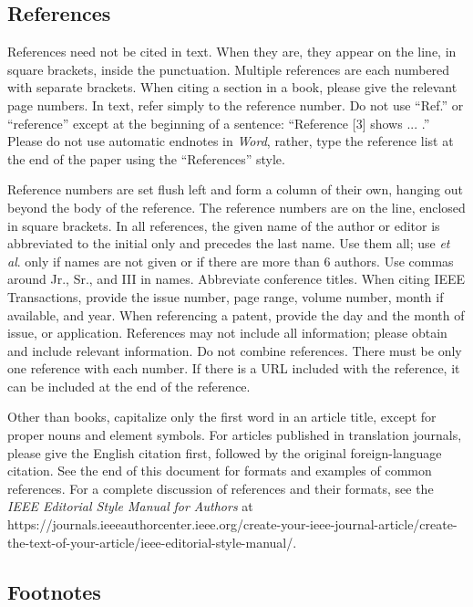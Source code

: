 \documentclass[letter]{IEEEtaes}
\begin{document}
\subsection{References}

References need not be cited in text. When they are, they appear on the line, in square brackets, inside the punctuation. Multiple references are each numbered with separate brackets. When citing a section in a book, please give the relevant page numbers. In text, refer simply to the reference number. Do not use ``Ref.'' or ``reference'' except at the beginning of a sentence: ``Reference {[}3{]} shows ... .'' Please do not use automatic endnotes in \emph{Word}, rather, type the reference list at the end of the paper using the ``References'' style.

Reference numbers are set flush left and form a column of their own, hanging out beyond the body of the reference. The reference numbers are on the line, enclosed in square brackets. In all references, the given name of the author or editor is abbreviated to the initial only and precedes the last name. Use them all; use \emph{et al}. only if names are not given or if there are more than 6 authors. Use commas around Jr., Sr., and III in names. Abbreviate conference titles. When citing IEEE Transactions, provide the issue number, page range, volume number, month if available, and year. When referencing a patent, provide the day and the month of issue, or application. References may not include all information; please obtain and include relevant information. Do not combine references. There must be only one reference with each number. If there is a URL included with the reference, it can be included at the end of the reference.

Other than books, capitalize only the first word in an article title, except for proper nouns and element symbols. For articles published in translation journals, please give the English citation first, followed by the original foreign-language citation. See the end of this document for formats and examples of common references. For a complete discussion of references and their formats, see the \emph{IEEE Editorial Style Manual} \emph{for Authors} at {{https://journals.ieeeauthorcenter.ieee.org/create-your-ieee-journal-article/create-the-text-of-your-article/ieee-editorial-style-manual/}}.

\subsection{Footnotes}
\end{document}
